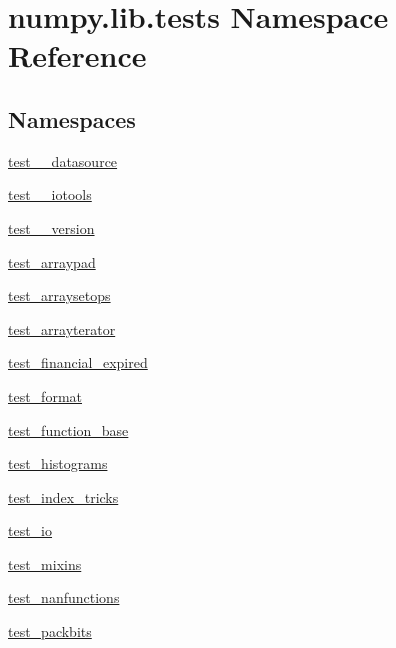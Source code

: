\hypertarget{namespacenumpy_1_1lib_1_1tests}{}\section{numpy.\+lib.\+tests Namespace Reference}
\label{namespacenumpy_1_1lib_1_1tests}
\subsection*{Namespaces}
\begin{DoxyCompactItemize}
\item 
 \hyperlink{namespacenumpy_1_1lib_1_1tests_1_1test____datasource}{test\+\_\+\+\_\+datasource}
\item 
 \hyperlink{namespacenumpy_1_1lib_1_1tests_1_1test____iotools}{test\+\_\+\+\_\+iotools}
\item 
 \hyperlink{namespacenumpy_1_1lib_1_1tests_1_1test____version}{test\+\_\+\+\_\+version}
\item 
 \hyperlink{namespacenumpy_1_1lib_1_1tests_1_1test__arraypad}{test\+\_\+arraypad}
\item 
 \hyperlink{namespacenumpy_1_1lib_1_1tests_1_1test__arraysetops}{test\+\_\+arraysetops}
\item 
 \hyperlink{namespacenumpy_1_1lib_1_1tests_1_1test__arrayterator}{test\+\_\+arrayterator}
\item 
 \hyperlink{namespacenumpy_1_1lib_1_1tests_1_1test__financial__expired}{test\+\_\+financial\+\_\+expired}
\item 
 \hyperlink{namespacenumpy_1_1lib_1_1tests_1_1test__format}{test\+\_\+format}
\item 
 \hyperlink{namespacenumpy_1_1lib_1_1tests_1_1test__function__base}{test\+\_\+function\+\_\+base}
\item 
 \hyperlink{namespacenumpy_1_1lib_1_1tests_1_1test__histograms}{test\+\_\+histograms}
\item 
 \hyperlink{namespacenumpy_1_1lib_1_1tests_1_1test__index__tricks}{test\+\_\+index\+\_\+tricks}
\item 
 \hyperlink{namespacenumpy_1_1lib_1_1tests_1_1test__io}{test\+\_\+io}
\item 
 \hyperlink{namespacenumpy_1_1lib_1_1tests_1_1test__mixins}{test\+\_\+mixins}
\item 
 \hyperlink{namespacenumpy_1_1lib_1_1tests_1_1test__nanfunctions}{test\+\_\+nanfunctions}
\item 
 \hyperlink{namespacenumpy_1_1lib_1_1tests_1_1test__packbits}{test\+\_\+packbits}

\end{DoxyCompactItemize}
